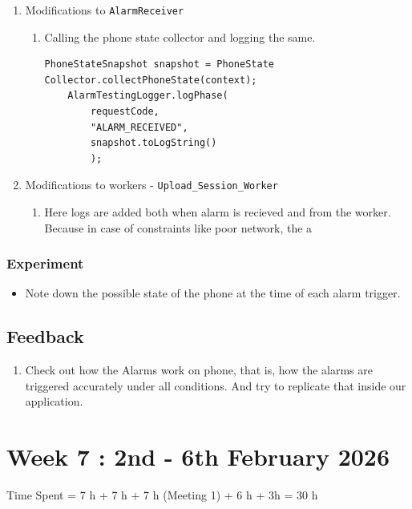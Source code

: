 \documentclass{article}
\begin{document}
\begin{enumerate}
\begin{enumerate}
    \end{enumerate}
    \item Modifications to \texttt{AlarmReceiver}
    \begin{enumerate}
        \item Calling the phone state collector and logging the same.
  \begin{lstlisting}[caption={Collecting Phone State and logging},label={label: Collecting Phone State and logging}]
    PhoneStateSnapshot snapshot = PhoneState
Collector.collectPhoneState(context);
    AlarmTestingLogger.logPhase(
        requestCode,
        "ALARM_RECEIVED",
        snapshot.toLogString()
        );
 \end{lstlisting} 
    \end{enumerate}
    \item Modifications to workers - \texttt{Upload\_Session\_Worker}
    \begin{enumerate}
        \item Here logs are added both when alarm is recieved and from the worker. Because in case of constraints like poor network, the a
    \end{enumerate}
\end{enumerate}

\subsubsection{Experiment}
\begin{itemize}
    \item Note down the possible state of the phone at the time of each alarm trigger.
\end{itemize}

\subsection{Feedback}
\begin{enumerate}
    \item Check out how the Alarms work on phone, that is, how the alarms are triggered accurately under all conditions. And try to replicate that inside our application. 
\end{enumerate}



\newpage
\section{Week 7 : 2nd - 6th February 2026}
Time Spent = 7 h + 7 h + 7 h (Meeting 1) + 6 h + 3h = 30 h
\end{document}

